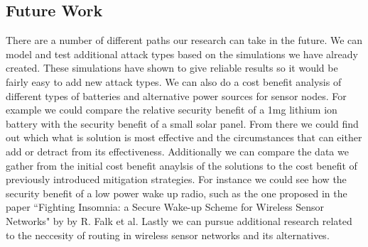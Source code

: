 \subsection{Future Work}
There are a number of different paths our research can take in the future.  We can model and test additional attack types based on the simulations we have already created. These simulations have shown to give reliable results so it would be fairly easy to add new attack types. We can also do a cost benefit analysis of different types of batteries and alternative power sources for sensor nodes. For example we could compare the relative security benefit of a 1mg lithium ion battery with the security benefit of a small solar panel.  From there we could find out which what is solution is most effective and the circumstances that can either add or detract from its effectiveness. Additionally we can compare the data we gather from the initial cost benefit anaylsis of the solutions to the cost benefit of previously introduced mitigation strategies.  For instance we could see how the security benefit of a low power wake up radio, such as the one proposed in the paper ``Fighting Insomnia: a Secure Wake-up Scheme for Wireless Sensor Networks" by by R. Falk et al.\cite{5211020} Lastly we can pursue additional research related to the neccesity of routing in wireless sensor networks and its alternatives.